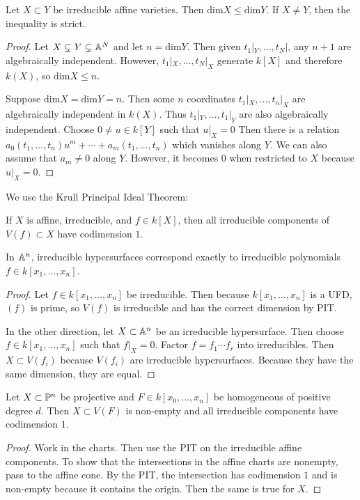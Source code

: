\documentclass[twoside, 10pt]{article}
\begin{document}
    \begin{lem}
        Let $X \subset Y$ be irreducible affine varieties. Then $\mathrm{dim} X \leq \mathrm{dim} Y$. If $X \neq Y$, then the inequality is strict.
        \begin{proof}
            Let $X \subsetneq Y \subsetneq \A^N$ and let $n = \mathrm{dim}Y$. Then given $t_1|_Y, \ldots, t_N|$, any $n+1$ are algebraically independent. However, $t_1|_X, \ldots, t_N|_X$ generate $k[X]$ and therefore $k(X)$, so $\mathrm{dim}X \leq n$. 
            
            Suppose $\mathrm{dim} X = \mathrm{dim} Y = n$. Then some $n$ coordinates $t_1|_X, \ldots, t_n|_X$ are algebraically independent in $k(X)$. Thus $t_1|_Y, \ldots, t_1|_Y$ are also algebraically independent. Choose $0 \neq u \in k[Y]$ such that $u|_X = 0$ Then there is a relation $a_0(t_1, \ldots, t_n)u^m + \cdots + a_m(t_1, \ldots, t_n)$ which vanishes along $Y$. We can also assume that $a_m \neq 0$ along $Y$. However, it becomes $0$ when restricted to $X$ because $u|_X = 0$.
        \end{proof}
    \end{lem}

    We use the Krull Principal Ideal Theorem:
    \begin{thm}
        If $X$ is affine, irreducible, and $f \in k[X]$, then all irreducible components of $V(f) \subset X$ have codimension $1$.
    \end{thm}

    \begin{cor}
        In $\A^n$, irreducible hypersurfaces correspond exactly to irreducible polynomials $f \in k[x_1, \ldots, x_n]$.
        \begin{proof}
            Let $f \in k[x_1, \ldots, x_n]$ be irreducible. Then because $k[x_1, \ldots, x_n]$ is a UFD, $(f)$ is prime, so $V(f)$ is irreducible and has the correct dimension by PIT.

            In the other direction, let $X \subset \A^n$ be an irreducible hypersurface. Then choose $f \in k[x_1, \ldots, x_n]$ such that $f|_X = 0$. Factor $f = f_1\cdots f_r$ into irreducibles. Then $X \subset V(f_i)$ because $V(f_i)$ are irreducible hypersurfaces. Because they have the same dimension, they are equal.
        \end{proof}
    \end{cor}

    \begin{cor}
        Let $X \subset \P^n$ be projective and $F \in k[x_0, \ldots, x_n]$ be homogeneous of positive degree $d$. Then $X \subset V(F)$ is non-empty and all irreducible components have codimension $1$.
        \begin{proof}
            Work in the charts. Then use the PIT on the irreducible affine components. To show that the intersections in the affine charts are nonempty, pass to the affine cone. By the PIT, the intersection has codimension $1$ and is non-empty because it contains the origin. Then the same is true for $X$.
        \end{proof}
    \end{cor}
\end{document}
